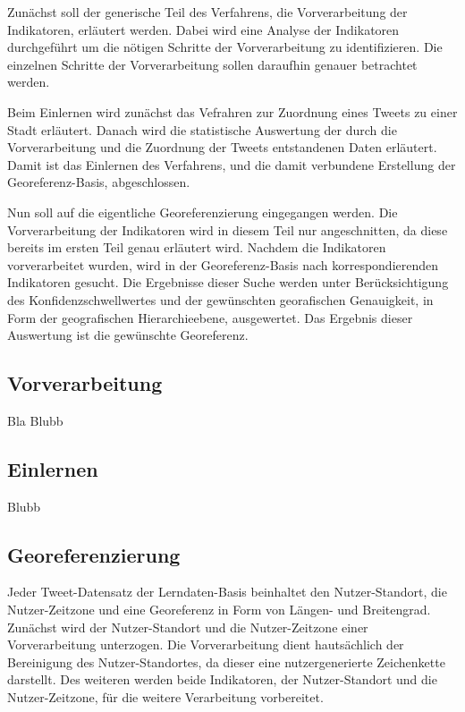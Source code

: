 	Zunächst soll der generische Teil des Verfahrens, die Vorverarbeitung der Indikatoren, erläutert werden.
	Dabei wird eine Analyse der Indikatoren durchgeführt um die nötigen Schritte der Vorverarbeitung zu identifizieren.   
	Die einzelnen Schritte der Vorverarbeitung sollen daraufhin genauer betrachtet werden.

	Beim Einlernen wird zunächst das Vefrahren zur Zuordnung eines Tweets zu einer Stadt erläutert. 
	Danach wird die statistische Auswertung der durch die Vorverarbeitung und die Zuordnung der Tweets entstandenen Daten erläutert.
	Damit ist das Einlernen des Verfahrens, und die damit verbundene Erstellung der Georeferenz-Basis, abgeschlossen.

	Nun soll auf die eigentliche Georeferenzierung eingegangen werden.
	Die Vorverarbeitung der Indikatoren wird in diesem Teil nur angeschnitten, da diese bereits im ersten Teil genau erläutert wird. 
	Nachdem die Indikatoren vorverarbeitet wurden, wird in der Georeferenz-Basis nach korrespondierenden Indikatoren gesucht. 
	Die Ergebnisse dieser Suche werden unter Berücksichtigung des Konfidenzschwellwertes und der gewünschten georafischen Genauigkeit, in Form der geografischen Hierarchieebene, ausgewertet.
	Das Ergebnis dieser Auswertung ist die gewünschte Georeferenz. 


	\subsection{Vorverarbeitung}
	Bla Blubb

	\subsection{Einlernen}
	Blubb

	\subsection{Georeferenzierung}   
	


	




	Jeder Tweet-Datensatz der Lerndaten-Basis beinhaltet den Nutzer-Standort, die Nutzer-Zeitzone und eine Georeferenz in Form von Längen- und Breitengrad.
	Zunächst wird der Nutzer-Standort und die Nutzer-Zeitzone einer Vorverarbeitung unterzogen. 
	Die Vorverarbeitung dient hautsächlich der Bereinigung des Nutzer-Standortes, da dieser eine nutzergenerierte Zeichenkette darstellt. 
	Des weiteren werden beide Indikatoren, der Nutzer-Standort und die Nutzer-Zeitzone, für die weitere Verarbeitung vorbereitet. 



